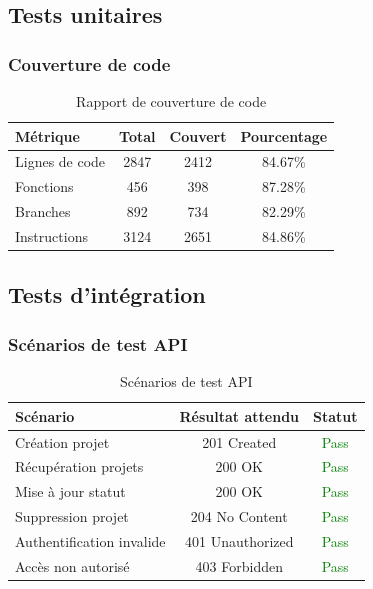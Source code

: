 \subsection{Tests unitaires}

\subsubsection{Couverture de code}
\begin{table}[h!]
\centering
\caption{Rapport de couverture de code}
\label{tab:coverage}
\begin{tabular}{|l|c|c|c|}
\hline
\textbf{Métrique} & \textbf{Total} & \textbf{Couvert} & \textbf{Pourcentage} \\
\hline
Lignes de code & 2847 & 2412 & 84.67\% \\
\hline
Fonctions & 456 & 398 & 87.28\% \\
\hline
Branches & 892 & 734 & 82.29\% \\
\hline
Instructions & 3124 & 2651 & 84.86\% \\
\hline
\end{tabular}
\end{table}

\subsection{Tests d'intégration}

\subsubsection{Scénarios de test API}
\begin{table}[h!]
\centering
\caption{Scénarios de test API}
\label{tab:api-tests}
\begin{tabular}{|l|c|c|}
\hline
\textbf{Scénario} & \textbf{Résultat attendu} & \textbf{Statut} \\
\hline
Création projet & 201 Created & \textcolor{green}{Pass} \\
\hline
Récupération projets & 200 OK & \textcolor{green}{Pass} \\
\hline
Mise à jour statut & 200 OK & \textcolor{green}{Pass} \\
\hline
Suppression projet & 204 No Content & \textcolor{green}{Pass} \\
\hline
Authentification invalide & 401 Unauthorized & \textcolor{green}{Pass} \\
\hline
Accès non autorisé & 403 Forbidden & \textcolor{green}{Pass} \\
\hline
\end{tabular}
\end{table}

